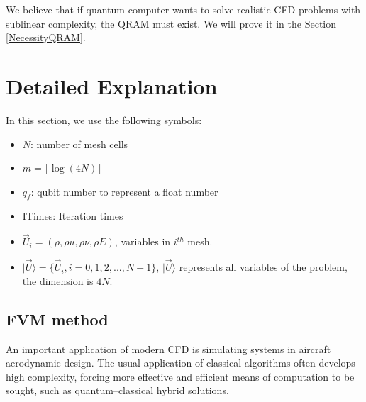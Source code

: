 \documentclass[%
 reprint,
 amsmath,amssymb,
pra,
]{revtex4-1}
\begin{document}
We believe that if quantum computer wants to solve realistic CFD problems with sublinear complexity, the QRAM must exist. We will prove it in the Section \ref{NecessityQRAM}.

\section{Detailed Explanation}\label{detail}
In this section, we use the following symbols:

\begin{itemize}
\item $N$: number of mesh cells
\item $m=\lceil \log(4N) \rceil$
\item $q_f$: qubit number to represent a float number
\item ITimes: Iteration times
\item $\vec{U}_i=(\rho,\rho u, \rho\nu, \rho E)$, variables in $i^{th}$ mesh.
\item $|\vec{U}\rangle=\{\vec{U}_i, i=0,1,2,...,N-1\}$, $|\vec{U}\rangle$ represents all variables of the problem, the dimension is $4N$.

\end{itemize}
\subsection{FVM method}\label{classicalFVM}

An important application of modern CFD is simulating systems in aircraft aerodynamic design. The usual application of classical algorithms often develops high complexity, forcing more effective and efficient means of computation to be sought, such as quantum--classical hybrid solutions.
\end{document}
